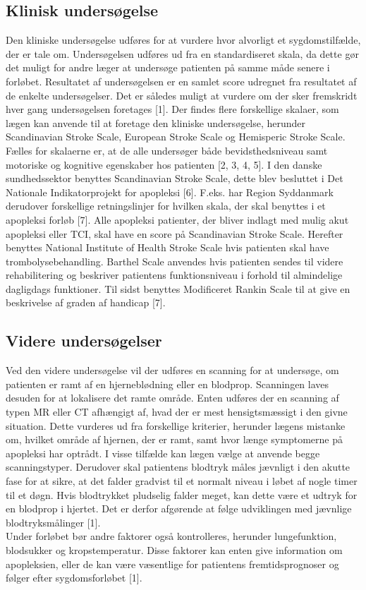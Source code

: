 \subsection{Klinisk undersøgelse}
Den kliniske undersøgelse udføres for at vurdere hvor alvorligt et sygdomstilfælde, der er tale om. Undersøgelsen udføres ud fra en standardiseret skala, da dette gør det muligt for andre læger at undersøge patienten på samme måde senere i forløbet. Resultatet af undersøgelsen er en samlet score udregnet fra resultatet af de enkelte undersøgelser. Det er således muligt at vurdere om der sker fremskridt hver gang undersøgelsen foretages [1]. 
Der findes flere forskellige skalaer, som lægen kan anvende til at foretage den kliniske undersøgelse, herunder Scandinavian Stroke Scale, European Stroke Scale og Hemisperic Stroke Scale. Fælles for skalaerne er, at de alle undersøger både bevidsthedsniveau samt motoriske og kognitive egenskaber hos patienten [2, 3, 4, 5]. I den danske sundhedssektor benyttes Scandinavian Stroke Scale, dette blev besluttet i Det Nationale Indikatorprojekt for apopleksi [6]. F.eks. har Region Syddanmark derudover forskellige retningslinjer for hvilken skala, der skal benyttes i et apopleksi forløb [7]. Alle apopleksi patienter, der bliver indlagt med mulig akut apopleksi eller TCI, skal have en score på Scandinavian Stroke Scale. Herefter benyttes National Institute of Health Stroke Scale hvis patienten skal have trombolysebehandling. Barthel Scale anvendes hvis patienten sendes til videre rehabilitering og beskriver patientens funktionsniveau i forhold til almindelige dagligdags funktioner. Til sidst benyttes Modificeret Rankin Scale til at give en beskrivelse af graden af handicap [7]. 

\subsection{Videre undersøgelser}
Ved den videre undersøgelse vil der udføres en scanning for at undersøge, om patienten er ramt af en hjerneblødning  eller en blodprop. Scanningen laves desuden for at lokalisere det ramte område. Enten udføres der en scanning af typen MR eller CT afhængigt af, hvad der er mest hensigtsmæssigt i den givne situation. Dette vurderes ud fra forskellige kriterier, herunder lægens mistanke om, hvilket område af hjernen, der er ramt, samt hvor længe symptomerne på apopleksi har optrådt. I visse tilfælde kan lægen vælge at anvende begge scanningstyper.  
Derudover skal patientens blodtryk måles jævnligt i den akutte fase for at sikre, at det falder gradvist til et normalt niveau i løbet af nogle timer til et døgn. Hvis blodtrykket pludselig falder meget, kan dette være et udtryk for en blodprop i hjertet. Det er derfor afgørende at følge udviklingen med jævnlige blodtryksmålinger [1].
\\
Under forløbet bør andre faktorer også kontrolleres, herunder lungefunktion, blodsukker og kropstemperatur. Disse faktorer kan enten give information om apopleksien, eller de kan være væsentlige for patientens fremtidsprognoser og følger efter sygdomsforløbet [1].
\\


